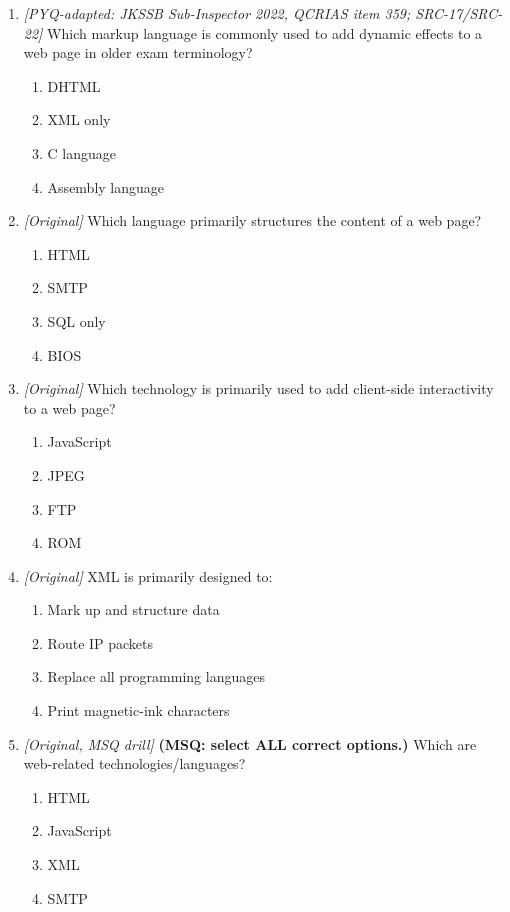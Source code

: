 \begin{enumerate}[label=\textbf{Q\arabic*.}, leftmargin=*]
\begin{enumerate}[label=\Alph*.]
  \end{enumerate}
\item \textit{[PYQ-adapted: JKSSB Sub-Inspector 2022, QCRIAS item 359; SRC-17/SRC-22]} Which markup language is commonly used to add dynamic effects to a web page in older exam terminology?
  \begin{enumerate}[label=\Alph*.]
\item DHTML
   \item XML only
   \item C language
   \item Assembly language
  \end{enumerate}

\item \textit{[Original]} Which language primarily structures the content of a web page?
  \begin{enumerate}[label=\Alph*.]
\item HTML
   \item SMTP
   \item SQL only
   \item BIOS
  \end{enumerate}

\item \textit{[Original]} Which technology is primarily used to add client-side interactivity to a web page?
  \begin{enumerate}[label=\Alph*.]
\item JavaScript
   \item JPEG
   \item FTP
   \item ROM
  \end{enumerate}

\item \textit{[Original]} XML is primarily designed to:
  \begin{enumerate}[label=\Alph*.]
\item Mark up and structure data
   \item Route IP packets
   \item Replace all programming languages
   \item Print magnetic-ink characters
  \end{enumerate}

\item \textit{[Original, MSQ drill]} \textbf{(MSQ: select ALL correct options.)} Which are web-related technologies/languages?
  \begin{enumerate}[label=\Alph*.]
\item HTML
   \item JavaScript
   \item XML
   \item SMTP
  \end{enumerate}

\end{enumerate}
